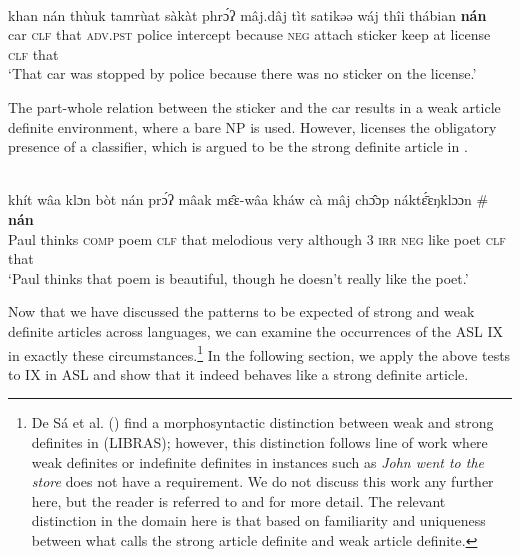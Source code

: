 \documentclass[output=paper,
modfonts
]{langscibook}
\begin{document}
\begin{exe}
\ex\label{ex:irani:18}  \\  {khan} {n{\'a}n} {th{\`u}uk} {tamr{\`u}at} {s{\`a}k{\`a}t} {phr{\'ɔ}ʔ} {m{\^a}j.d{\^a}j} {t{\`i}t} {satikəə} {w{\'a}j} {th{\^i}i} {th{\'a}bian}  {\textbf{n{\'a}n}}\cp\\
car \textsc{clf} that \textsc{adv}.\textsc{pst} police intercept because \textsc{neg} attach sticker keep at license \phantom{\#\op}\textsc{clf} that\\
\trans `That car was stopped by police because there was no sticker on the license.' \citep[7]{Jenks2015}
\end{exe} 

The part-whole relation between the sticker and the car results in a weak article definite environment, where a bare NP is used. However,  licenses the obligatory presence of a classifier, which is argued to be the strong definite article in  \citep{Jenks2015}. \newpage

\begin{exe} 
\ex {} \\  {kh{\'i}t} {w{\^a}a} {klɔn} {b{\`o}t} {n{\'a}n} {pr{\'ɔ}ʔ} {m{\^a}ak} {m{\^ɛ}{ɛ}-w{\^a}a} {kh{\'a}w} {c{\`a}} {m{\^a}j} {ch{\^ɔ}{ɔ}p} {n{\'a}kt{\'{\={ɛ}}}{ɛ}ŋklɔɔn} \# {\textbf{n{\'a}n}}\cp\\
Paul thinks \textsc{comp} poem \textsc{clf} that melodious very although 3 \textsc{irr} \textsc{neg} like poet \phantom{\#\op}\textsc{clf} that\\
\trans `Paul thinks that poem is beautiful, though he doesn’t really like the poet.' \citep[7]{Jenks2015}
\end{exe}

Now that we have discussed the patterns to be expected of strong and weak definite articles across languages, we can examine the occurrences of the ASL IX in exactly these circumstances.\footnote{De Sá et al. (\citeyear{SaEtAlii2012}) find a morphosyntactic distinction between weak and strong definites in  (LIBRAS); however, this distinction follows  line of work where weak definites or indefinite definites in instances such as \textit{John went to the store} does not have a  requirement. We do not discuss this work any further here, but the reader is referred to \citet{CarlsonSussman2005} and \citet{CarlsonEtAlii2006} for more detail. The relevant distinction in the  domain here is that based on familiarity and uniqueness between what \citet{Schwarz2009} calls the strong article definite and weak article definite.} In the following section, we apply the above tests to IX in ASL and show that it indeed behaves like a strong definite article.
\end{document}
